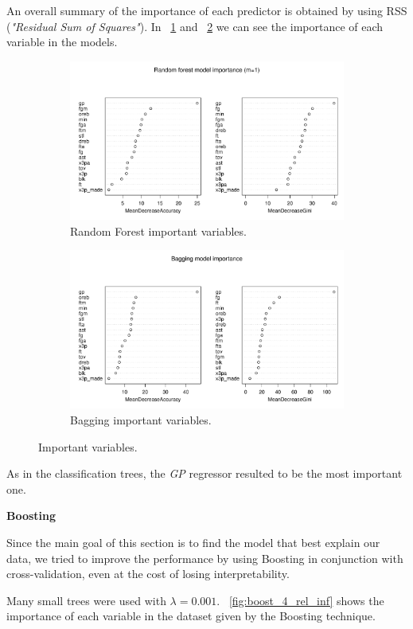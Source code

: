 An overall summary of the importance of each predictor is obtained by using RSS (\textit{"Residual Sum of Squares"}). In \Fig~\ref{fig:best_for_500_var_imp_plot} and \Fig~\ref{fig:bagg_500_var_imp_plot} we can see the importance of each variable in the models.

\begin{figure}[h]
	\centering
	\begin{subfigure}{.5\textwidth}
		\centering
		\includegraphics[width=0.5\linewidth]{ImageFiles/Classification/Trees/best_for_500_var_imp_plot}
		\caption{Random Forest important variables.}
		\label{fig:best_for_500_var_imp_plot}
	\end{subfigure}%
	\hfill
	\begin{subfigure}{.5\textwidth}
		\centering
		\includegraphics[width=0.5\linewidth]{ImageFiles/Classification/Trees/bagg_500_var_imp_plot}
		\caption{Bagging important variables.}
		\label{fig:bagg_500_var_imp_plot}
	\end{subfigure}
	\caption{Important variables.}
	\label{fig:ImpVar}
\end{figure}

\noindent
As in the classification trees, the \textit{GP} regressor resulted to be the most important one.

\vspace{0.2cm}
\noindent
\textbf{Boosting}

Since the main goal of this section is to find the model that best explain our data, we tried to improve the performance by using Boosting in conjunction with cross-validation, even at the cost of losing interpretability. 

Many small trees were used with $\lambda = 0.001$. \Fig~\ref{fig:boost_4_rel_inf} shows the importance of each variable in the dataset given by the Boosting technique.

